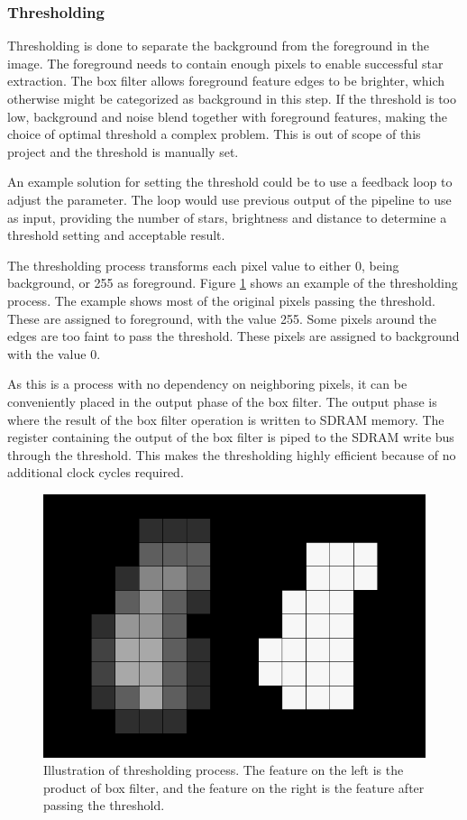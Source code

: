 \documentclass[12pt]{report}
\begin{document}
\subsubsection{Thresholding}
Thresholding is done to separate the background from the foreground in the image. The foreground needs to contain enough pixels to enable successful star extraction. The box filter allows foreground feature edges to be brighter, which otherwise might be categorized as background in this step. If the threshold is too low, background and noise blend together with foreground features, making the choice of optimal threshold a complex problem. This is out of scope of this project and the threshold is manually set.
\par
An example solution for setting the threshold could be to use a feedback loop to adjust the parameter. The loop would use previous output of the pipeline to use as input, providing the number of stars, brightness and distance to determine a threshold setting and acceptable result.
\par
The thresholding process transforms each pixel value to either 0, being background, or 255 as foreground. Figure \ref*{fig:thresholding} shows an example of the thresholding process. The example shows most of the original pixels passing the threshold. These are assigned to foreground, with the value 255. Some pixels around the edges are too faint to pass the threshold. These pixels are assigned to background with the value 0.
\par
 As this is a process with no dependency on neighboring pixels, it can be conveniently placed in the output phase of the box filter. The output phase is where the result of the box filter operation is written to SDRAM memory. The register containing the output of the box filter is piped to the SDRAM write bus through the threshold. This makes the thresholding highly efficient because of no additional clock cycles required.

\begin{figure}[h]
    \centering
    \includegraphics[scale=0.25]{figures/thresholding.png}
    \caption{Illustration of thresholding process. The feature on the left is the product of box filter, and the feature on the right is the feature after passing the threshold.}
    \label{fig:thresholding}
\end{figure}
\end{document}
